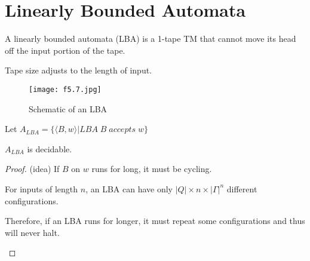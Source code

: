 \section{Linearly Bounded Automata}

\begin{definition}
A linearly bounded automata (LBA) is a 1-tape TM that cannot move its head off the input portion of the tape.
\end{definition}

\begin{remark}
    Tape size adjusts to the length of input.
\end{remark}

\begin{figure}[H]
    \centering
    \texttt{[image: f5.7.jpg]}
    \caption{Schematic of an LBA}
\end{figure}

\begin{theorem}
    Let \(A_{LBA} = \{ \langle B, w \rangle | LBA\; B \; accepts \; w\} \) 

    \(A_{LBA}\) is decidable. 
\end{theorem}
\begin{proof}
    (idea) If \(B\) on \(w\) runs for long, it must be cycling. 

    \begin{remark}
        For inputs of length \(n\), an LBA  can have only \(|Q| \times n \times |\Gamma|^n\) different configurations. 

        Therefore, if an LBA runs for longer, it must repeat some configurations and thus will never halt.
    \end{remark}
\end{proof}

